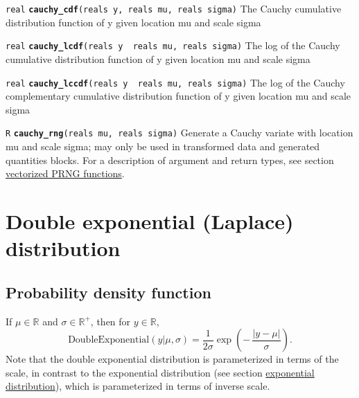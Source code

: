 \documentclass[
  10pt,
]{book}
\begin{document}

\texttt{real} \textbf{\texttt{cauchy\_cdf}}\texttt{(reals\ y,\ reals\ mu,\ reals\ sigma)}\newline
The Cauchy cumulative distribution function of y given location mu and
scale sigma


\texttt{real} \textbf{\texttt{cauchy\_lcdf}}\texttt{(reals\ y\ \textbar{}\ reals\ mu,\ reals\ sigma)}\newline
The log of the Cauchy cumulative distribution function of y given
location mu and scale sigma


\texttt{real} \textbf{\texttt{cauchy\_lccdf}}\texttt{(reals\ y\ \textbar{}\ reals\ mu,\ reals\ sigma)}\newline
The log of the Cauchy complementary cumulative distribution function
of y given location mu and scale sigma


\texttt{R} \textbf{\texttt{cauchy\_rng}}\texttt{(reals\ mu,\ reals\ sigma)}\newline
Generate a Cauchy variate with location mu and scale sigma; may only
be used in transformed data and generated quantities blocks.
For a description of argument and return types, see section
\protect\hyperlink{prng-vectorization}{vectorized PRNG functions}.

\hypertarget{double-exponential-laplace-distribution}{%
\section{Double exponential (Laplace) distribution}\label{double-exponential-laplace-distribution}}

\hypertarget{probability-density-function-5}{%
\subsection{Probability density function}\label{probability-density-function-5}}

If \(\mu \in \mathbb{R}\) and \(\sigma \in \mathbb{R}^+\), then for \(y \in \mathbb{R}\), \[ \text{DoubleExponential}(y|\mu,\sigma) =
\frac{1}{2\sigma}   \exp \left( - \, \frac{|y - \mu|}{\sigma} \right)
. \] Note that the double exponential distribution is parameterized in
terms of the scale, in contrast to the exponential distribution (see
section \protect\hyperlink{exponential-distribution}{exponential distribution}), which is
parameterized in terms of inverse scale.
\end{document}
